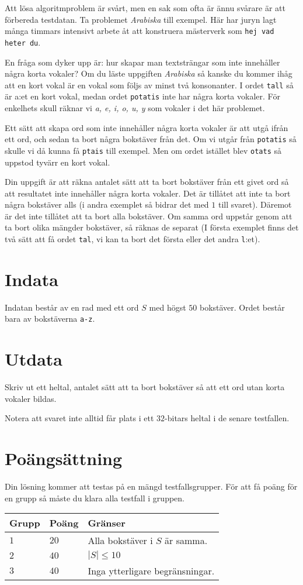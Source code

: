 Att lösa algoritmproblem är svårt, men en sak som ofta är ännu svårare är att förbereda
testdatan. Ta problemet \textit{Arabiska} till exempel. Här har juryn lagt
många timmars intensivt arbete åt att konstruera mästerverk som \texttt{hej vad heter du}.

En fråga som dyker upp är: hur skapar man textsträngar som inte innehåller några korta vokaler?
Om du läste uppgiften \textit{Arabiska} så kanske du kommer ihåg att en kort vokal är en
vokal som följs av minst två konsonanter. I ordet \texttt{tall} så är a:et en kort vokal, medan
ordet \texttt{potatis} inte har några korta vokaler. För enkelhets skull räknar vi  \textit{a, e, i, o, u, y} 
som vokaler i det här problemet.


Ett sätt att skapa ord som inte innehåller några korta vokaler är att utgå ifrån ett ord,
och sedan ta bort några bokstäver från det. Om vi utgår från \texttt{potatis} så 
skulle vi då kunna få \texttt{ptais} till exempel. Men om ordet istället blev \texttt{otats} så uppstod
tyvärr en kort vokal.


Din uppgift är att räkna antalet sätt att ta bort bokstäver från ett givet ord så att resultatet inte
innehåller några korta vokaler. Det är tillåtet att inte ta bort några bokstäver alls (i andra exemplet
så bidrar det med $1$ till svaret). Däremot är det inte tillåtet att ta bort alla bokstäver. Om samma ord
uppstår genom att ta bort olika mängder bokstäver, så räknas de separat (I första exemplet finns det två sätt
att få ordet \texttt{tal}, vi kan ta bort det första eller det andra \texttt{l}:et).

\section*{Indata}
Indatan består av en rad med ett ord $S$ med högst $50$ bokstäver. Ordet består bara av bokstäverna \texttt{a-z}.

\section*{Utdata}
Skriv ut ett heltal, antalet sätt att ta bort bokstäver så att ett ord utan korta vokaler bildas.

Notera att svaret inte alltid får plats i ett $32$-bitars heltal i de senare testfallen.

\section*{Poängsättning}
Din lösning kommer att testas på en mängd testfallsgrupper.
För att få poäng för en grupp så måste du klara alla testfall i gruppen.

\noindent
\begin{tabular}{| l | l | p{12cm} |}
  \hline
  \textbf{Grupp} & \textbf{Poäng} & \textbf{Gränser} \\ \hline
  $1$    & $20$      & Alla bokstäver i $S$ är samma. \\ \hline
  $2$    & $40$      & $|S| \leq 10$ \\ \hline
  $3$    & $40$      & Inga ytterligare begränsningar. \\ \hline
\end{tabular}
